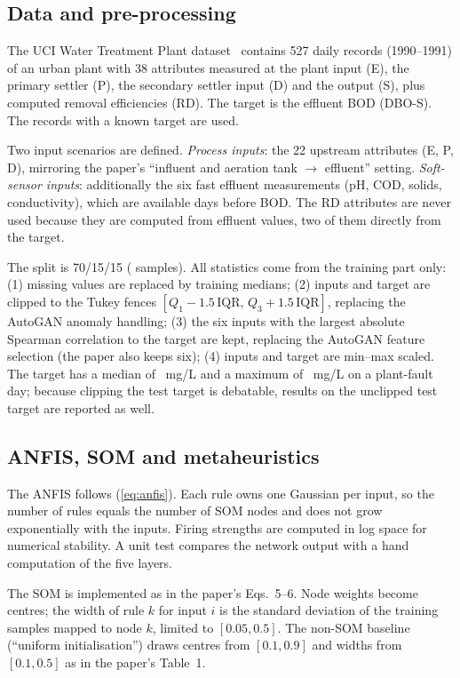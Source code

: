 \documentclass[conference]{IEEEtran}
\begin{document}
\subsection{Data and pre-processing}
The UCI Water Treatment Plant dataset~\cite{poch1993} contains 527 daily records (1990--1991) of an urban plant with 38 attributes measured at the plant input (E), the primary settler (P), the secondary settler input (D) and the output (S), plus computed removal efficiencies (RD). The target is the effluent BOD (DBO-S). The \factnrows{} records with a known target are used.

Two input scenarios are defined. \emph{Process inputs}: the 22 upstream attributes (E, P, D), mirroring the paper's ``influent and aeration tank $\rightarrow$ effluent'' setting. \emph{Soft-sensor inputs}: additionally the six fast effluent measurements (pH, COD, solids, conductivity), which are available days before BOD. The RD attributes are never used because they are computed from effluent values, two of them directly from the target.

The split is 70/15/15 (\factysplit{} samples). All statistics come from the training part only: (1) missing values are replaced by training medians; (2) inputs and target are clipped to the Tukey fences $[Q_1-1.5\,\mathrm{IQR},\,Q_3+1.5\,\mathrm{IQR}]$, replacing the AutoGAN anomaly handling; (3) the six inputs with the largest absolute Spearman correlation to the target are kept, replacing the AutoGAN feature selection (the paper also keeps six); (4) inputs and target are min--max scaled. The target has a median of \facttargetmedian{}~mg/L and a maximum of \facttargetmax{}~mg/L on a plant-fault day; because clipping the test target is debatable, results on the unclipped test target are reported as well.

\subsection{ANFIS, SOM and metaheuristics}
The ANFIS follows (\ref{eq:anfis}). Each rule owns one Gaussian per input, so the number of rules equals the number of SOM nodes and does not grow exponentially with the inputs. Firing strengths are computed in log space for numerical stability. A unit test compares the network output with a hand computation of the five layers.

The SOM is implemented as in the paper's Eqs.~5--6. Node weights become centres; the width of rule $k$ for input $i$ is the standard deviation of the training samples mapped to node $k$, limited to $[0.05, 0.5]$. The non-SOM baseline (``uniform initialisation'') draws centres from $[0.1,0.9]$ and widths from $[0.1,0.5]$ as in the paper's Table~1.
\end{document}

